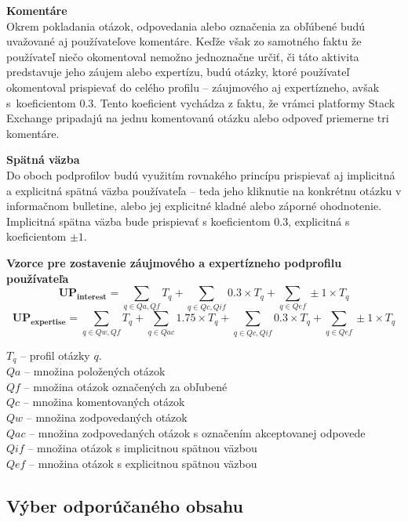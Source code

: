 \textbf{Komentáre}\\
Okrem pokladania otázok, odpovedania alebo označenia za obľúbené budú uvažované aj používateľove komentáre. Keďže však
zo samotného faktu že používateľ niečo okomentoval nemožno jednoznačne určiť, či táto aktivita predstavuje jeho záujem
alebo expertízu, budú otázky, ktoré používateľ okomentoval prispievať do celého profilu -- záujmového aj expertízneho, avšak
s~koeficientom $0.3$. Tento koeficient vychádza z faktu, že vrámci platformy Stack Exchange pripadajú na jednu
komentovanú otázku alebo odpoveď priemerne tri komentáre.

\textbf{Spätná väzba}\\
Do oboch podprofilov budú využitím rovnakého princípu prispievať aj implicitná a explicitná spätná väzba používateľa --
teda jeho kliknutie na konkrétnu otázku v informačnom bulletine, alebo jej explicitné kladné alebo záporné ohodnotenie.
Implicitná spätna väzba bude prispievať s koeficientom $0.3$, explicitná s koeficientom $\pm1$.

\textbf{Vzorce pre zostavenie záujmového a expertízneho podprofilu používateľa}\\
$$\mathbf{UP_{interest}} = \sum_{q \in Qa, Qf}T_q + \sum_{q \in Qc, Qif}0.3 \times T_q + \sum_{q \in Qef}\pm1 \times T_q$$
$$\mathbf{UP_{expertise}} = \sum_{q \in Qw, Qf}T_q + \sum_{q \in Qac}1.75 \times T_q + \sum_{q \in Qc, Qif}0.3 \times T_q + \sum_{q \in Qef}\pm1 \times T_q$$
\begin{adjustwidth}{1cm}{1cm}
$T_q$ -- profil otázky $q$.\\
$Qa$ -- množina položených otázok\\
$Qf$ -- množina otázok označených za obľubené\\
$Qc$ -- množina komentovaných otázok\\
$Qw$ -- množina zodpovedaných otázok\\
$Qac$ -- množina zodpovedaných otázok s označením akceptovanej odpovede\\
$Qif$ -- množina otázok s implicitnou spätnou väzbou\\
$Qef$ -- množina otázok s explicitnou spätnou väzbou\\
\end{adjustwidth}

\subsection{Výber odporúčaného obsahu}\label{design:rec-retrieval}

